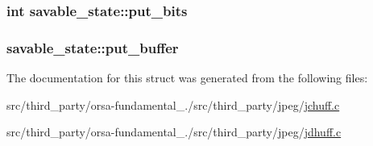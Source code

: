 \subsubsection[{put\+\_\+bits}]{\setlength{\rightskip}{0pt plus 5cm}int savable\+\_\+state\+::put\+\_\+bits}\label{structsavable__state_a767d7a21d1bd5bee01108b947bfc9fbf}
\hypertarget{structsavable__state_a71fdab6bc3ab791e85f61179045da4dd}{}
\subsubsection[{put\+\_\+buffer}]{ savable\+\_\+state\+::put\+\_\+buffer}\label{structsavable__state_a71fdab6bc3ab791e85f61179045da4dd}


The documentation for this struct was generated from the following files\+:\begin{DoxyCompactItemize}
\item 
src/third\+\_\+party/orsa-\/fundamental\+\_./src/third\+\_\+party/jpeg/\hyperlink{jchuff_8c}{jchuff.\+c}\item 
src/third\+\_\+party/orsa-\/fundamental\+\_./src/third\+\_\+party/jpeg/\hyperlink{jdhuff_8c}{jdhuff.\+c}\end{DoxyCompactItemize}
